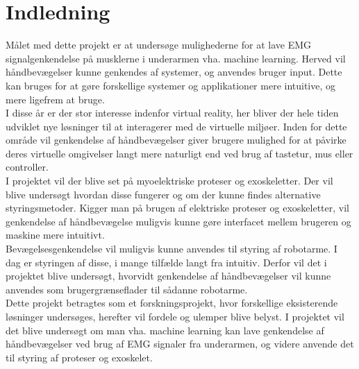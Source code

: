 \thispagestyle{fancy}
\chapter{Indledning}
\label{chp:indledning}
Målet med dette projekt er at undersøge mulighederne for at lave EMG signalgenkendelse på musklerne i underarmen vha. machine learning. Herved vil håndbevægelser kunne genkendes af systemer, og anvendes bruger input. Dette kan bruges for at gøre forskellige systemer og applikationer mere intuitive, og mere ligefrem at bruge.\\

I disse år er der stor interesse indenfor virtual reality, her bliver der hele tiden udviklet nye løsninger til at interagerer med de virtuelle miljøer. Inden for dette område vil genkendelse af håndbevægelser giver brugere mulighed for at påvirke deres virtuelle omgivelser langt mere naturligt end ved brug af tastetur, mus eller controller.\\

I projektet vil der blive set på myoelektriske proteser og exoskeletter. Der vil blive undersøgt hvordan disse fungerer og om der kunne findes alternative styringsmetoder.
Kigger man på brugen af elektriske proteser og exoskeletter, vil genkendelse af håndbevægelse muligvis kunne gøre interfacet mellem brugeren og maskine mere intuitivt.\\

Bevægelsesgenkendelse vil muligvis kunne anvendes til styring af robotarme. I dag er styringen af disse, i mange tilfælde langt fra intuitiv. Derfor vil det i projektet blive undersøgt, hvorvidt genkendelse af håndbevægelser vil kunne anvendes som brugergrænseflader til sådanne robotarme. \\

Dette projekt betragtes som et forskningsprojekt, hvor forskellige eksisterende løsninger undersøges, herefter vil fordele og ulemper blive belyst. I projektet vil det blive undersøgt om man vha. machine learning kan lave genkendelse af håndbevægelser ved brug af EMG signaler fra underarmen, og videre anvende det til styring af proteser og exoskelet.

%
%
%
%
